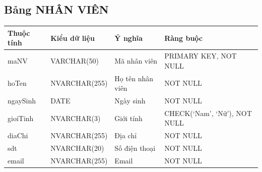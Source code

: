 \documentclass[a4paper,12pt]{report}
\begin{document}
\subsection{Bảng NHÂN VIÊN}
\noindent
\begin{center}
    \begin{longtable}{|>{\centering\arraybackslash}p{3cm}|
        >{\centering\arraybackslash}p{4cm}|
        >{\centering\arraybackslash}p{4cm}|
        >{\centering\arraybackslash}p{4cm}|}
        \hline
        \textbf{Thuộc tính}                                                                                                               &
        \textbf{Kiểu dữ liệu}                                                                                                                             &
        \textbf{Ý nghĩa}                                                                                                 &
        \textbf{Ràng buộc}                                                                                                         \\
        \hline
        maNV &  VARCHAR(50)  & Mã nhân viên & PRIMARY KEY, NOT NULL \\
        \hline
        hoTen &  NVARCHAR(255)  & Họ tên nhân viên & NOT NULL \\                                                                                                                          
        \hline
        ngaySinh & DATE & Ngày sinh & NOT NULL \\                                                                                                                          
        \hline
        gioiTinh & NVARCHAR(3) & Giới tính & CHECK(‘Nam’, ‘Nữ’), NOT NULL \\                                                                                                                          
        \hline
        diaChi & NVARCHAR(255) & Địa chỉ & NOT NULL \\                                                                                                                          
        \hline
        sdt & NVARCHAR(20) & Số điện thoại & NOT NULL \\                                                                                                                          
        \hline
        email & NVARCHAR(255) & Email & NOT NULL \\                                                                                                                          

\end{longtable}
\end{center}
\end{document}
